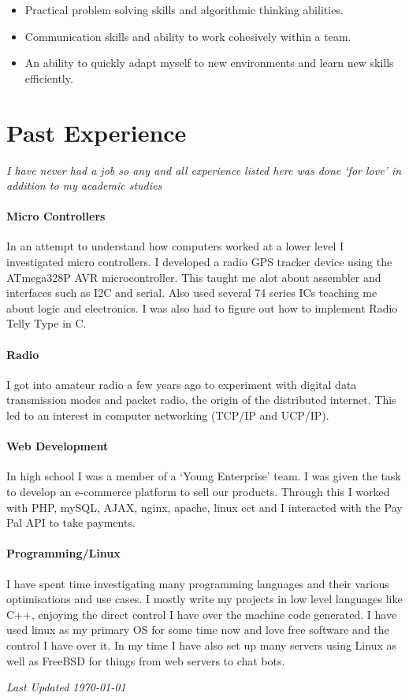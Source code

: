 \documentclass[10pt,a4paper]{article}
\begin{document}
\begin{multicols*}{2}
\begin{itemize}
\item Practical problem solving skills and algorithmic thinking abilities.

\item Communication skills and ability to work cohesively within a team.

\item An ability to quickly adapt myself to new environments and learn new skills efficiently.
\end{itemize}

\section*{Past Experience}
\textit{I have never had a job so any and all experience listed here was done `for love' in addition to my academic studies}

\paragraph{Micro Controllers} In an attempt to understand how computers worked at a lower level I investigated micro controllers.
I developed a radio GPS tracker device using the ATmega328P AVR microcontroller.
This taught me alot about assembler and interfaces such as I2C and serial.
Also used several 74 series ICs teaching me about logic and electronics.
I was also had to figure out how to implement Radio Telly Type in C.

\paragraph{Radio} I got into amateur radio a few years ago to experiment with digital data transmission modes and packet radio, the origin of the distributed internet.
This led to an interest in computer networking (TCP/IP and UCP/IP).

\paragraph{Web Development} In high school I was a member of a `Young Enterprise' team.
I was given the task to develop an e-commerce platform to sell our products.
Through this I worked with PHP, mySQL, AJAX, nginx, apache, linux ect
and I interacted with the Pay Pal API to take payments.

\paragraph{Programming/Linux} I have spent time investigating many programming languages and their various optimisations and use cases.
I mostly write my projects in low level languages like C++, enjoying the direct control I have over the machine code generated.
I have used linux as my primary OS for some time now and love free software and the control I have over it.
In my time I have also set up many servers using Linux as well as FreeBSD for things from web servers to chat bots.

\vfill
\textit{Last Updated \today}
\end{multicols*}
\end{document}
